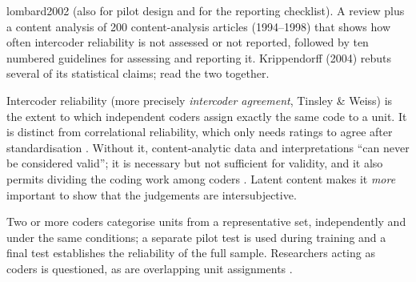 \begin{papercard}{lombard2002}
  (also  for pilot design and  for the reporting checklist). A review plus a content analysis of 200 content-analysis articles (1994--1998) that shows how often intercoder reliability is not assessed or not reported, followed by ten numbered guidelines for assessing and reporting it. Krippendorff (2004) rebuts several of its statistical claims; read the two together.

 Intercoder reliability (more precisely \emph{intercoder agreement}, Tinsley \& Weiss) is the extent to which independent coders assign exactly the same code to a unit. It is distinct from correlational reliability, which only needs ratings to agree after standardisation . Without it, content-analytic data and interpretations ``can never be considered valid''; it is necessary but not sufficient for validity, and it also permits dividing the coding work among coders . Latent content makes it \emph{more} important to show that the judgements are intersubjective.

 Two or more coders categorise units from a representative set, independently and under the same conditions; a separate pilot test is used during training and a final test establishes the reliability of the full sample. Researchers acting as coders is questioned, as are overlapping unit assignments .


\end{papercard}
